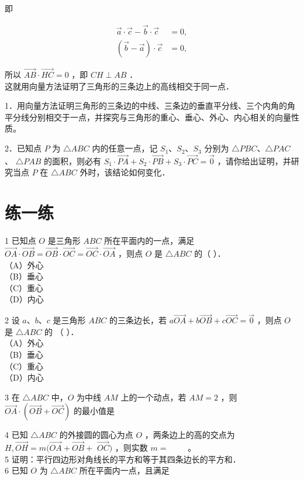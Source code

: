 \documentclass[10pt]{article}
\begin{document}
即

\[
\begin{aligned}
\vec{a} \cdot \vec{c}-\vec{b} \cdot \vec{c} & =0, \\
(\vec{b}-\vec{a}) \cdot \vec{c} & =0,
\end{aligned}
\]

所以 \(\overrightarrow{A B} \cdot \overrightarrow{H C}=0\) ，即 \(C H \perp A B\) ．\\
这就用向量方法证明了三角形的三条边上的高线相交于同一点．

1．用向量方法证明三角形的三条边的中线、三条边的垂直平分线、三个内角的角平分线分别相交于一点，并探究与三角形的重心、垂心、外心、内心相关的向量性质。

2．已知点 \(P\) 为 \(\triangle A B C\) 内的任意一点，记 \(S_{1} 、 S_{2} 、 S_{3}\) 分别为 \(\triangle P B C 、 \triangle P A C\) 、 \(\triangle P A B\) 的面积，则必有 \(S_{1} \cdot \overrightarrow{P A}+S_{2} \cdot \overrightarrow{P B}+S_{3} \cdot \overrightarrow{P C}=\overrightarrow{0}\) ，请你给出证明，并研究当点 \(P\) 在 \(\triangle A B C\) 外时，该结论如何变化．

\section*{练一练}
1 已知点 \(O\) 是三角形 \(A B C\) 所在平面内的一点，满足 \(\overrightarrow{O A} \cdot \overrightarrow{O B}=\overrightarrow{O B} \cdot \overrightarrow{O C}=\overrightarrow{O C} \cdot \overrightarrow{O A}\) ，则点 \(O\) 是 \(\triangle A B C\) 的（ ）．\\
（A）外心\\
（B）垂心\\
（C）重心\\
（D）内心

2 设 \(a 、 b 、 c\) 是三角形 \(A B C\) 的三条边长，若 \(a \overrightarrow{O A}+b \overrightarrow{O B}+c \overrightarrow{O C}=\overrightarrow{0}\) ，则点 \(O\) 是 \(\triangle A B C\) 的 （ ）．\\
（A）外心\\
（B）垂心\\
（C）重心\\
（D）内心

3 在 \(\triangle A B C\) 中，\(O\) 为中线 \(A M\) 上的一个动点，若 \(A M=2\) ，则 \(\overrightarrow{O A} \cdot(\overrightarrow{O B}+\overrightarrow{O C})\) 的最小值是

4 已知 \(\triangle A B C\) 的外接圆的圆心为点 \(O\) ，两条边上的高的交点为 \(H, \overrightarrow{O H}=m(\overrightarrow{O A}+\overrightarrow{O B}+\) \(\overrightarrow{O C})\) ，则实数 \(m=\) \(\qquad\)。\\
5 证明：平行四边形对角线长的平方和等于其四条边长的平方和．\\
6 已知 \(O\) 为 \(\triangle A B C\) 所在平面内一点，且满足
\end{document}
